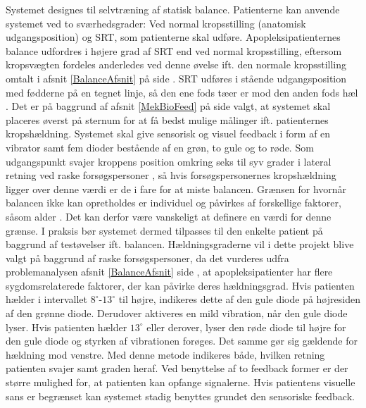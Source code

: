 Systemet designes til selvtræning af statisk balance. Patienterne kan anvende systemet ved to sværhedsgrader: Ved normal kropsstilling (anatomisk udgangsposition) og SRT, som patienterne skal udføre. Apopleksipatienternes balance udfordres i højere grad af SRT end ved normal kropsstilling, eftersom kropsvægten fordeles anderledes ved denne øvelse ift. den normale kropsstilling omtalt i afsnit \ref{BalanceAfsnit} på side \pageref{BalanceAfsnit}. SRT udføres i stående udgangsposition med fødderne på en tegnet linje, så den ene fods tæer er mod den anden fods hæl \cite{Huo1999}. %
Det er på baggrund af afsnit \ref{MekBioFeed} på side \pageref{MekBioFeed} valgt, at systemet skal placeres øverst på sternum for at få bedst mulige målinger ift. patienternes kropshældning. Systemet skal give sensorisk og visuel feedback i form af en vibrator samt fem dioder bestående af en grøn, to gule og to røde. Som udgangspunkt svajer kroppens position omkring seks til syv grader i lateral retning ved raske forsøgspersoner \cite{Wang2010,Huo1999} , så hvis forsøgspersonernes kropshældning ligger over denne værdi er de i fare for at miste balancen. Grænsen for hvornår balancen ikke kan opretholdes er individuel og påvirkes af forskellige faktorer, såsom alder \cite{Huo1999}. Det kan derfor være vanskeligt at definere en værdi for denne grænse. I praksis bør systemet dermed tilpasses til den enkelte patient på baggrund af testøvelser ift. balancen. Hældningsgraderne vil i dette projekt blive valgt på baggrund af raske forsøgspersoner, da det vurderes udfra problemanalysen afsnit \ref{BalanceAfsnit} side \pageref{BalanceAfsnit}, at apopleksipatienter har flere sygdomsrelaterede faktorer, der kan påvirke deres hældningsgrad. Hvis patienten hælder i intervallet $8^{\circ}$-$13^{\circ}$ til højre, indikeres dette af den gule diode på højresiden af den grønne diode. Derudover aktiveres en mild vibration, når den gule diode lyser. Hvis patienten hælder $13^{\circ}$ eller derover, lyser den røde diode til højre for den gule diode og styrken af vibrationen forøges. Det samme gør sig gældende for hældning mod venstre. Med denne metode indikeres både, hvilken retning patienten svajer samt graden heraf. Ved benyttelse af to feedback former er der større mulighed for, at patienten kan opfange signalerne. Hvis patientens visuelle sans er begrænset kan systemet stadig benyttes grundet den sensoriske feedback. \\ 

